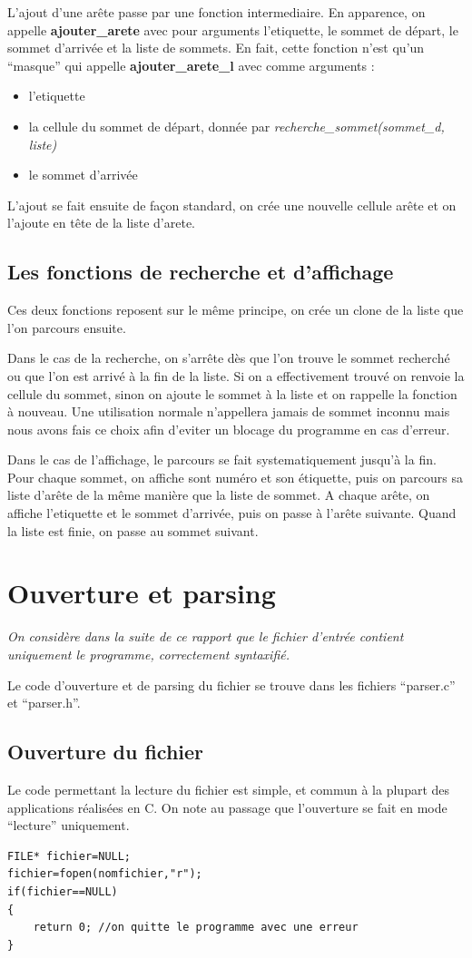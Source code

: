 \documentclass[a4paper,11pt]{article}
\begin{document}
		L'ajout d'une arête passe par une fonction intermediaire. En apparence, on appelle \textbf{ajouter\_arete} avec pour arguments l'etiquette, le sommet de départ, le sommet d'arrivée et la liste de sommets. En fait, cette fonction n'est qu'un ``masque'' qui appelle \textbf{ajouter\_arete\_l} avec comme arguments : 
		\begin{itemize}
			\item l'etiquette
			\item la cellule du sommet de départ, donnée par \textit{recherche\_sommet(sommet\_d, liste)}
			\item le sommet d'arrivée
		\end{itemize}
		L'ajout se fait ensuite de façon standard, on crée une nouvelle cellule arête et on l'ajoute en tête de la liste d'arete.
	\subsection{Les fonctions de recherche et d'affichage}
		Ces deux fonctions reposent sur le même principe, on crée un clone de la liste que l'on parcours ensuite.

 Dans le cas de la recherche, on s'arrête dès que l'on trouve le sommet recherché ou que l'on est arrivé à la fin de la liste. Si on a effectivement trouvé on renvoie la cellule du sommet, sinon on ajoute le sommet à la liste et on rappelle la fonction à nouveau. Une utilisation normale n'appellera jamais de sommet inconnu mais nous avons fais ce choix afin d'eviter un blocage du programme en cas d'erreur.

	Dans le cas de l'affichage, le parcours se fait systematiquement jusqu'à la fin. Pour chaque sommet, on affiche sont numéro et son étiquette, puis on parcours sa liste d'arête de la même manière que la liste de sommet. A chaque arête, on affiche l'etiquette et le sommet d'arrivée, puis on passe à l'arête suivante. Quand la liste est finie, on passe au sommet suivant.

	\section{Ouverture et parsing}
		\textit{On considère dans la suite de ce rapport que le fichier d'entrée contient uniquement le programme, correctement syntaxifié.}
		
		Le code d'ouverture et de parsing du fichier se trouve dans les fichiers ``parser.c'' et ``parser.h''.
		\subsection{Ouverture du fichier}
		Le code permettant la lecture du fichier est simple, et commun à la plupart des applications réalisées en C. On note au passage que l'ouverture se fait en mode ``lecture'' uniquement.
		\begin{lstlisting}
FILE* fichier=NULL;
fichier=fopen(nomfichier,"r");
if(fichier==NULL)
{
	return 0; //on quitte le programme avec une erreur
}
		\end{lstlisting}
\end{document}
